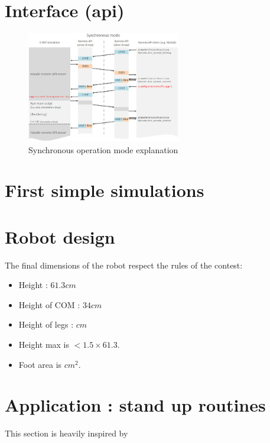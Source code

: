 \section{Interface (api)}

\begin{figure}[htp]
\center
\includegraphics[width=0.6\textwidth]{figures/remoteApiSynchronous}
\caption{Synchronous operation mode explanation}
\label{fig:remoteApi}
\end{figure}

\section{First simple simulations}

\section{Robot design}

The final dimensions of the robot respect the rules of the contest:
\begin{itemize}
\item Height : $61.3cm$
\item Height of COM : $34cm$
\item Height of legs : $cm$
\item Height max is $< 1.5 \times 61.3$.
\item Foot area is $ cm^2$.
\end{itemize} 

\section{Application : stand up routines}
This section is heavily inspired by \cite{Stuckler06}